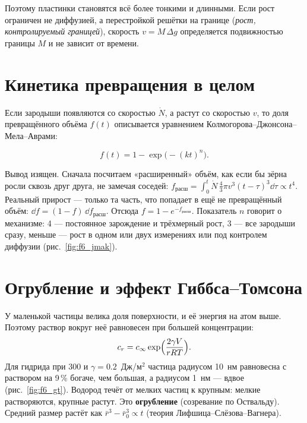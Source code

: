 Поэтому пластинки становятся всё более тонкими и длинными. Если рост ограничен не диффузией, а перестройкой
решётки на границе (\emph{рост, контролируемый границей}), скорость $v = M\,\Delta g$ определяется подвижностью
границы $M$ и не зависит от времени.

\section{Кинетика превращения в целом}

Если зародыши появляются со скоростью $\dot N$, а растут со скоростью $v$, то доля превращённого объёма $f(t)$
описывается уравнением Колмогорова--Джонсона--Мела--Аврами:
\begin{keyf}
\[
f(t) = 1 - \exp\bigl(-(kt)^n\bigr).
\]
\end{keyf}
Вывод изящен. Сначала посчитаем «расширенный» объём, как если бы зёрна росли сквозь друг друга, не замечая
соседей: $f_{\text{расш}} = \int_0^t\dot N\,\tfrac43\pi v^3(t-\tau)^3\dd\tau\propto t^4$. Реальный прирост --- только
та часть, что попадает в ещё не превращённый объём: $\dd f = (1-f)\,\dd f_{\text{расш}}$. Отсюда
$f = 1-e^{-f_{\text{расш}}}$. Показатель $n$ говорит о механизме: 4 --- постоянное зарождение и трёхмерный рост,
3 --- все зародыши сразу, меньше --- рост в одном или двух измерениях или под контролем диффузии
(рис.~\ref{fig:f6_jmak}).


\section{Огрубление и эффект Гиббса--Томсона}

У маленькой частицы велика доля поверхности, и её энергия на атом выше. Поэтому раствор вокруг неё равновесен
при большей концентрации:
\begin{equation}
c_r = c_\infty\exp\Bigl(\frac{2\gamma V}{rRT}\Bigr).
\end{equation}
Для гидрида при 300\degC{} и $\gamma=0.2$~Дж/м$^2$ частица радиусом 10~нм равновесна с раствором на 9\,\% богаче, чем
большая, а радиусом 1~нм --- вдвое (рис.~\ref{fig:f6_gt}). Водород течёт от мелких частиц к крупным: мелкие
растворяются, крупные растут. Это \textbf{огрубление} (созревание по Оствальду). Средний размер растёт как
$\bar r^3 - \bar r_0^3\propto t$ (теория Лифшица--Слёзова--Вагнера).

